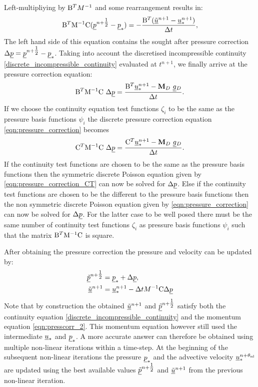 Left-multipliying by $\mathrm{B}^TM^{-1}$ and
some rearrangement results in:
\begin{equation*}
  \mathrm{B}^T \mathrm{M^{-1}}\mathrm{C} ( \underline{p}^{n+\tfrac 12} -  \underline{p}_*)
  =-\frac{\mathrm{B}^T  ({\underline{\tilde u}^{n+1}-\underline{u}_*^{n+1}})}{\Delta t},
\end{equation*}
The left hand side of this equation contains the sought after pressure
correction $\Delta\underline{p}=\underline{p}^{n+\tfrac 12}-\underline{p}_*$.
Taking into account the discretised incompressible continuity
\eqref{discrete_incompressible_continuity} evaluated at
$t^{n+1}$, we finally arrive at the pressure correction equation:
\begin{equation}
 \mathrm{B}^T \mathrm{M^{-1}}\mathrm{C}~\Delta\underline{p}
   =\frac{ \mathrm{B}^T \underline{u}_*^{n+1}-{\mbox{\boldmath$\mathrm{M}$}}_D ~\underline{g}{}_D}{\Delta t}.
   \label{eqn:pressure_correction}
\end{equation}
If we choose the continuity equation test functions $\zeta_{i}$ to be the 
same as the pressure basis functions $\psi_i$ the discrete pressure correction 
equation \eqref{eqn:pressure_correction} becomes
\begin{equation}
 \mathrm{C}^T \mathrm{M^{-1}}\mathrm{C}~\Delta\underline{p}
   =\frac{ \mathrm{C}^T \underline{u}_*^{n+1}-{\mbox{\boldmath$\mathrm{M}$}}_D ~\underline{g}{}_D}{\Delta t}.
   \label{eqn:pressure_correction_CT}
\end{equation}
If the continuity test functions are chosen to be the same
as the pressure basis functions then the symmetric discrete Poisson equation 
given by \eqref{eqn:pressure_correction_CT} can now be solved
for $\Delta\underline{p}$. Else if the continuity test functions are chosen to be the
different to the pressure basis functions then the non symmetric discrete Poisson equation 
given by \eqref{eqn:pressure_correction} can now be solved for $\Delta\underline{p}$. For the latter 
case to be well posed there must be the same number of continuity test functions $\zeta_{i}$ as 
pressure basis functions $\psi_{i}$ such that the matrix $\mathrm{B}^T \mathrm{M^{-1}}\mathrm{C}$ is square.

After obtaining the pressure correction the pressure and velocity can
be updated by:
\begin{equation*}
\begin{split}
  \underline{\tilde p}^{n+\tfrac 12} &= \underline{p}_* + \Delta\underline{p}, \\
  \underline{\tilde u}^{n+1} &= \underline{u}_*^{n+1}
  -\Delta t  M^{-1} \mathrm{C} \Delta\underline{p}
\end{split}
\end{equation*}
Note that by construction the obtained $\underline{\tilde u}^{n+1}$ and
$\underline{\tilde p}^{n+\tfrac 12}$ satisfy both the continuity equation
\eqref{discrete_incompressible_continuity} and the momentum equation
\eqref{eqn:presscorr_2}. This momentum equation however still used
the intermediate $\underline{u}_*$ and $\underline{p}_*$.
A more accurate answer can therefore
be obtained using multiple non-linear iterations within a
time-step. At the beginning of the subsequent non-linear iterations
the pressure $\underline{p}_*$ and the advective velocity
$\underline{u}_*^{n+\theta_{\mathrm{nl}}}$ are updated using the best available values
$\underline{\tilde p}^{n+\tfrac 12}$ and $\underline{\tilde u}^{n+1}$ from the previous
non-linear iteration.


